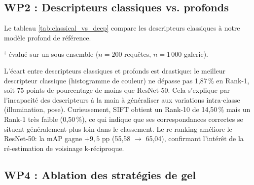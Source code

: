 \subsection{WP2 : Descripteurs classiques vs. profonds}

Le tableau \ref{tab:classical_vs_deep} compare les descripteurs classiques à notre modèle profond de référence.

\begin{table}[t]
\centering
\caption{Comparaison des descripteurs classiques et profonds sur Market-1501.}
\label{tab:classical_vs_deep}
\vspace{1pt}
\footnotesize{$^\dagger$ évalué sur un sous-ensemble ($n{=}200$ requêtes, $n{=}1\,000$ galerie).}
\end{table}

L'écart entre descripteurs classiques et profonds est drastique: le meilleur descripteur classique (histogramme de couleur) ne dépasse pas 1,87\,\% en Rank-1, soit 75 points de pourcentage de moins que ResNet-50. Cela s'explique par l'incapacité des descripteurs à la main à généraliser aux variations intra-classe (illumination, pose). Curieusement, SIFT obtient un Rank-10 de 14,50\,\% mais un Rank-1 très faible (0,50\,\%), ce qui indique que ses correspondances correctes se situent généralement plus loin dans le classement. Le re-ranking améliore le ResNet-50: la mAP gagne $+9,5$ pp (55,58 $\to$ 65,04), confirmant l'intérêt de la ré-estimation de voisinage k-réciproque.

\subsection{WP4 : Ablation des stratégies de gel}

